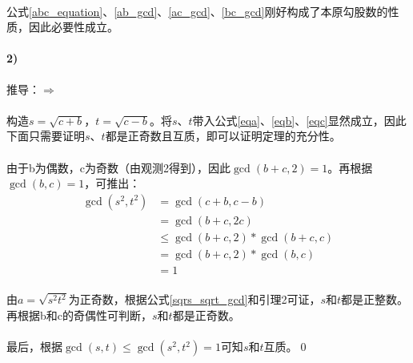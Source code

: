\documentclass[UTF8]{ctexart}
\begin{document}
	\paragraph{} 公式\ref{abc_equation}、\ref{ab_gcd}、\ref{ac_gcd}、\ref{bc_gcd}刚好构成了本原勾股数的性质，因此必要性成立。

	\paragraph{2)} 推导：$\Rightarrow$
	\paragraph{} 构造$s=\sqrt{c+b}$，$t=\sqrt{c-b}$。将$s$、$t$带入公式\ref{eqa}、\ref{eqb}、\ref{eqc}显然成立，因此下面只需要证明$s$、$t$都是正奇数且互质，即可以证明定理的充分性。
	\paragraph{} 由于b为偶数，c为奇数（由观测2得到），因此$\gcd(b+c,2)=1$。再根据$\gcd(b,c)=1$，可推出：
	\begin{equation}\label{sqrs_sqrt_gcd}
		\begin{aligned}
			\gcd(s^2,t^2)&=\gcd(c+b,c-b)\\
			             &=\gcd(b+c,2c)\\
			             &{\leq}\gcd(b+c,2)*\gcd(b+c,c)\\
						 &=\gcd(b+c,2)*\gcd(b,c)\\
						 &=1
		\end{aligned}
	\end{equation}
	\paragraph{} 由$a=\sqrt{s^2t^2}$为正奇数，根据公式\ref{sqrs_sqrt_gcd}和引理2可证，$s$和$t$都是正整数。再根据b和c的奇偶性可判断，$s$和$t$都是正奇数。
	\paragraph{} 最后，根据$\gcd(s,t){\leq}\gcd(s^2,t^2)=1$可知$s$和$t$互质。\qed	
\end{document}
